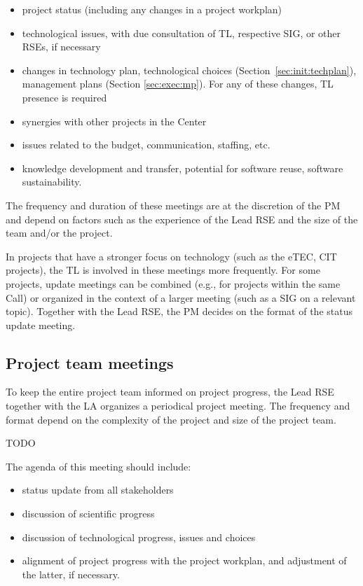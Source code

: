 \documentclass[11pt]{article}
\begin{document}
\begin{itemize}
\item project status (including any changes in a project workplan)
\item technological issues, with due consultation of TL, respective SIG, or other RSEs, if necessary
\item changes in technology plan, technological choices (Section~\ref{sec:init:techplan}), management plans (Section
\ref{sec:exec:mp}). For any of these changes, TL presence is required
\item synergies with other projects in the Center
\item issues related to the budget, communication, staffing, etc.
\item knowledge development and transfer, potential for software reuse, software sustainability.
\end{itemize}

The frequency and duration of these meetings are at the discretion of the PM and depend on factors such as the
experience of the Lead RSE and the size of the team and/or the project. 

In projects that have a stronger focus on technology (such as the eTEC, CIT projects), the TL is involved in these
meetings more frequently. For some projects, update meetings can be combined (e.g., for projects within the same Call)
or organized in the context of a larger meeting (such as a SIG on a relevant topic). Together with the Lead RSE, the PM
decides on the format of the status update meeting.


\subsection{Project team meetings}
To keep the entire project team informed on project progress, the Lead RSE together with the LA organizes a periodical
project meeting. The frequency and format depend on the complexity of the project and size of the project team.

TODO

The agenda of this meeting should include:
\begin{itemize}
\item status update from all stakeholders
\item discussion of scientific progress
\item discussion of technological progress, issues and choices
\item alignment of project progress with the project workplan, and adjustment of the latter, if necessary.
\end{itemize}
\end{document}

